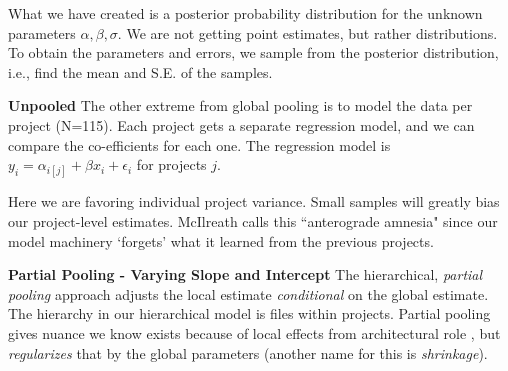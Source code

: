 \documentclass[sigconf,natbib=false]{acmart}
\begin{document}
What we have created is a posterior probability distribution for the unknown parameters $\alpha, \beta, \sigma$. We are not getting point estimates, but rather distributions. To obtain the parameters and errors, we sample from the posterior distribution, i.e., find the mean and S.E. of the samples.



\noindent\textbf{Unpooled}
The other extreme from global pooling is to model the data per project (N=115). Each project gets a separate regression model, and we can compare the co-efficients for each one. The regression model is $y_i = \alpha_{i[j]} + \beta x_i + \epsilon_i $ for projects $j$.


Here we are favoring individual project variance. Small samples will greatly bias our project-level estimates. McIlreath \cite{mcilreath16} calls this ``anterograde amnesia" since our model machinery `forgets' what it learned from the previous projects. 

\noindent\textbf{Partial Pooling - Varying Slope and Intercept}
The hierarchical, \emph{partial pooling} approach adjusts the local estimate \emph{conditional} on the global estimate. The hierarchy in our hierarchical model is files within projects.  Partial pooling gives nuance we know exists because of local effects from architectural role \cite{Aniche2016}, but \emph{regularizes} that by the global parameters (another name for this is \emph{shrinkage}).   %
\end{document}
